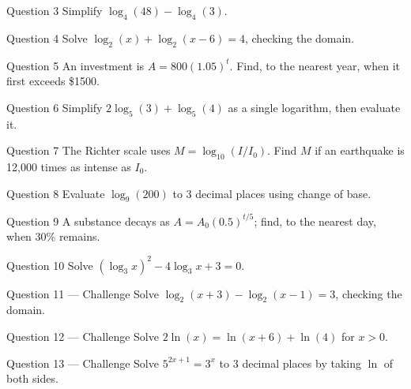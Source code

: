 \documentclass[11pt]{article}
\begin{document}
\begin{qbox}{Question 3}
Simplify $\log_4(48)-\log_4(3)$.\workspace{2.4cm}
\end{qbox}

\begin{qbox}{Question 4}
Solve $\log_2(x)+\log_2(x-6)=4$, checking the domain.\workspace{2.4cm}
\end{qbox}

\begin{qbox}{Question 5}
An investment is $A=800(1.05)^t$. Find, to the nearest year, when it first exceeds \$1500.\workspace{2.4cm}
\end{qbox}

\begin{qbox}{Question 6}
Simplify $2\log_5(3)+\log_5(4)$ as a single logarithm, then evaluate it.\workspace{2.4cm}
\end{qbox}

\begin{qbox}{Question 7}
The Richter scale uses $M=\log_{10}(I/I_0)$. Find $M$ if an earthquake is 12{,}000 times as intense as $I_0$.\workspace{2.4cm}
\end{qbox}

\begin{qbox}{Question 8}
Evaluate $\log_9(200)$ to 3 decimal places using change of base.\workspace{2.4cm}
\end{qbox}

\begin{qbox}{Question 9}
A substance decays as $A=A_0(0.5)^{t/5}$; find, to the nearest day, when 30\% remains.\workspace{2.4cm}
\end{qbox}

\begin{qbox}{Question 10}
Solve $(\log_3x)^2-4\log_3x+3=0$.\workspace{2.4cm}
\end{qbox}

\begin{qbox}{Question 11 --- Challenge}
Solve $\log_2(x+3)-\log_2(x-1)=3$, checking the domain.\workspace{3.4cm}
\end{qbox}

\begin{qbox}{Question 12 --- Challenge}
Solve $2\ln(x)=\ln(x+6)+\ln(4)$ for $x>0$.\workspace{3.4cm}
\end{qbox}

\begin{qbox}{Question 13 --- Challenge}
Solve $5^{2x+1}=3^{x}$ to 3 decimal places by taking $\ln$ of both sides.\workspace{3.4cm}
\end{qbox}
\end{document}
